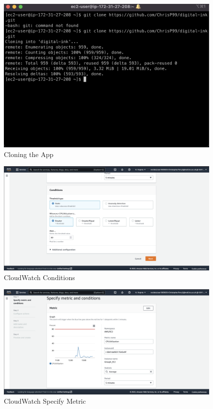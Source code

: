 \begin{figure}[H]
    \centering
        \includegraphics[width=\textwidth]{resources/cloning-the-app.png}
    \caption{Cloning the App}
    \label{fig:cloning-the-app}
\end{figure}

\begin{figure}[H]
    \centering
        \includegraphics[width=\textwidth]{resources/cloudwatch-conditions.png}
    \caption{CloudWatch Conditions}
    \label{fig:cloudwatch-conditions}
\end{figure}

\begin{figure}[H]
    \centering
        \includegraphics[width=\textwidth]{resources/cloudwatch-specify-metric.png}
    \caption{CloudWatch Specify Metric}
    \label{fig:cloudwatch-specify-metric}
\end{figure}

